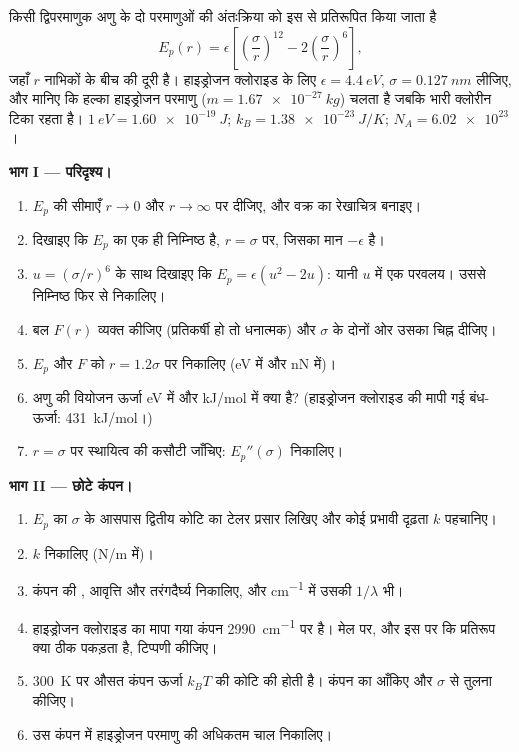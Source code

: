 \begin{problem}
\label{pb:b1:work-and-energy:1}
किसी द्विपरमाणुक अणु के दो परमाणुओं की अंतःक्रिया को इस  से
प्रतिरूपित किया जाता है
\[
E_p(r) = \epsilon\left[\left(\frac{\sigma}{r}\right)^{12} - 2\left(\frac{\sigma}{r}\right)^{6}\right],
\]
जहाँ $r$ नाभिकों के बीच की दूरी है। हाइड्रोजन क्लोराइड के लिए
$\epsilon = \qty{4.4}{eV}$, $\sigma = \qty{0.127}{nm}$ लीजिए, और मानिए कि
हल्का हाइड्रोजन परमाणु ($m = \qty{1.67e-27}{kg}$) चलता है जबकि भारी क्लोरीन
टिका रहता है। $\qty{1}{eV} = \qty{1.60e-19}{J}$; $k_B = \qty{1.38e-23}{J/K}$;
$N_A = \num{6.02e23}$।

\medskip
\noindent\textbf{भाग I --- परिदृश्य।}
\begin{enumerate}
  \item $E_p$ की सीमाएँ $r \to 0$ और $r \to \infty$ पर दीजिए, और वक्र का
        रेखाचित्र बनाइए।
  \item दिखाइए कि $E_p$ का एक ही निम्निष्ठ है, $r = \sigma$ पर, जिसका मान
        $-\epsilon$ है।
  \item $u = (\sigma/r)^6$ के साथ दिखाइए कि $E_p = \epsilon(u^2 - 2u)$: यानी
        $u$ में एक परवलय। उससे निम्निष्ठ फिर से निकालिए।
  \item बल $F(r)$ व्यक्त कीजिए (प्रतिकर्षी हो तो धनात्मक) और $\sigma$ के
        दोनों ओर उसका चिह्न दीजिए।
  \item $E_p$ और $F$ को $r = 1.2\sigma$ पर निकालिए (eV में और nN में)।
  \item अणु की वियोजन ऊर्जा eV में और \unit{kJ/mol} में क्या है?
        (हाइड्रोजन क्लोराइड की मापी गई बंध-ऊर्जा: \qty{431}{kJ/mol}।)
  \item $r = \sigma$ पर स्थायित्व की कसौटी जाँचिए: $E_p''(\sigma)$
        निकालिए।
\end{enumerate}

\medskip
\noindent\textbf{भाग II --- छोटे कंपन।}
\begin{enumerate}[resume]
  \item $E_p$ का $\sigma$ के आसपास द्वितीय कोटि का टेलर प्रसार लिखिए और
        कोई प्रभावी दृढ़ता $k$ पहचानिए।
  \item $k$ निकालिए (\unit{N/m} में)।
  \item कंपन की , आवृत्ति और तरंगदैर्घ्य निकालिए, और
        \unit{cm^{-1}} में उसकी  $1/\lambda$ भी।
  \item हाइड्रोजन क्लोराइड का मापा गया कंपन \qty{2990}{cm^{-1}} पर है। मेल
        पर, और इस पर कि प्रतिरूप क्या ठीक पकड़ता है, टिप्पणी कीजिए।
  \item \qty{300}{K} पर औसत कंपन ऊर्जा $k_BT$ की कोटि की होती है। कंपन का
         आँकिए और $\sigma$ से तुलना कीजिए।
  \item उस कंपन में हाइड्रोजन परमाणु की अधिकतम चाल निकालिए।
\end{enumerate}


\end{problem}
